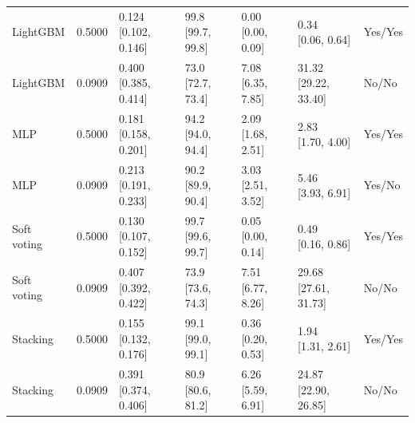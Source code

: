 \begin{table}[htbp]
{\begin{tabular}{lllllll}
LightGBM & 0.5000 & \shortstack{{0.124} \\ {[0.102, 0.146]}} & \shortstack{{99.8} \\ {[99.7, 99.8]}} & \shortstack{{0.00} \\ {[0.00, 0.09]}} & \shortstack{{0.34} \\ {[0.06, 0.64]}} & Yes/Yes \\
LightGBM & 0.0909 & \shortstack{{0.400} \\ {[0.385, 0.414]}} & \shortstack{{73.0} \\ {[72.7, 73.4]}} & \shortstack{{7.08} \\ {[6.35, 7.85]}} & \shortstack{{31.32} \\ {[29.22, 33.40]}} & No/No \\
MLP & 0.5000 & \shortstack{{0.181} \\ {[0.158, 0.201]}} & \shortstack{{94.2} \\ {[94.0, 94.4]}} & \shortstack{{2.09} \\ {[1.68, 2.51]}} & \shortstack{{2.83} \\ {[1.70, 4.00]}} & Yes/Yes \\
MLP & 0.0909 & \shortstack{{0.213} \\ {[0.191, 0.233]}} & \shortstack{{90.2} \\ {[89.9, 90.4]}} & \shortstack{{3.03} \\ {[2.51, 3.52]}} & \shortstack{{5.46} \\ {[3.93, 6.91]}} & Yes/No \\
Soft voting & 0.5000 & \shortstack{{0.130} \\ {[0.107, 0.152]}} & \shortstack{{99.7} \\ {[99.6, 99.7]}} & \shortstack{{0.05} \\ {[0.00, 0.14]}} & \shortstack{{0.49} \\ {[0.16, 0.86]}} & Yes/Yes \\
Soft voting & 0.0909 & \shortstack{{0.407} \\ {[0.392, 0.422]}} & \shortstack{{73.9} \\ {[73.6, 74.3]}} & \shortstack{{7.51} \\ {[6.77, 8.26]}} & \shortstack{{29.68} \\ {[27.61, 31.73]}} & No/No \\
Stacking & 0.5000 & \shortstack{{0.155} \\ {[0.132, 0.176]}} & \shortstack{{99.1} \\ {[99.0, 99.1]}} & \shortstack{{0.36} \\ {[0.20, 0.53]}} & \shortstack{{1.94} \\ {[1.31, 2.61]}} & Yes/Yes \\
Stacking & 0.0909 & \shortstack{{0.391} \\ {[0.374, 0.406]}} & \shortstack{{80.9} \\ {[80.6, 81.2]}} & \shortstack{{6.26} \\ {[5.59, 6.91]}} & \shortstack{{24.87} \\ {[22.90, 26.85]}} & No/No \\
\bottomrule
\end{tabular}
}
\end{table}
